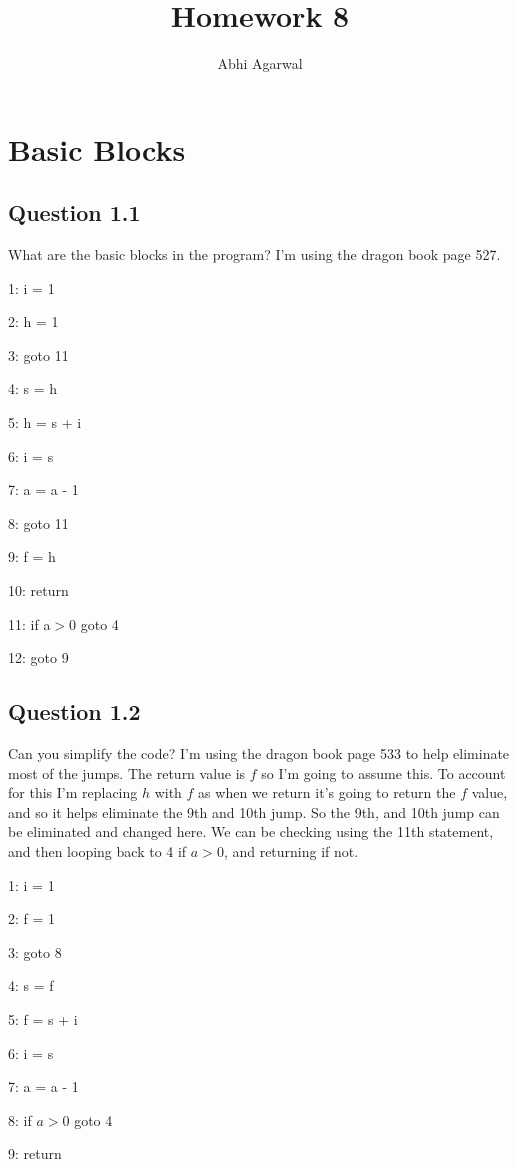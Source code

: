 \documentclass[11pt, oneside]{article}   	%
\title{Homework 8}
\author{Abhi Agarwal}
\date{}
\begin{document}
\maketitle

\section{Basic Blocks}

\subsection{Question 1.1}

\par What are the basic blocks in the program? I'm using the dragon book page 527.
\par 1: i = 1
\par 2: h = 1
\par 3: goto 11
\newline
\par 4: s = h
\par 5: h = s + i
\par 6: i = s
\par 7: a = a - 1
\par 8: goto 11
\newline
\par 9: f = h
\par 10: return
\newline
\par 11: if a$>$0 goto 4
\newline
\par 12: goto 9

\newpage
\subsection{Question 1.2}
\par Can you simplify the code? I'm using the dragon book page 533 to help eliminate most of the jumps. The return value is $f$ so I'm going to assume this. To account for this I'm replacing $h$ with $f$ as when we return it's going to return the $f$ value, and so it helps eliminate the 9th and 10th jump. So the 9th, and 10th jump can be eliminated and changed here. We can be checking using the 11th statement, and then looping back to 4 if $a>0$, and returning if not.
\par 1: i = 1
\par 2: f = 1
\par 3: goto 8
\newline
\par 4: s = f
\par 5: f = s + i
\par 6: i = s
\par 7: a = a - 1
\newline
\par 8: if $a>0$ goto 4
\newline
\par 9: return
\end{document}
